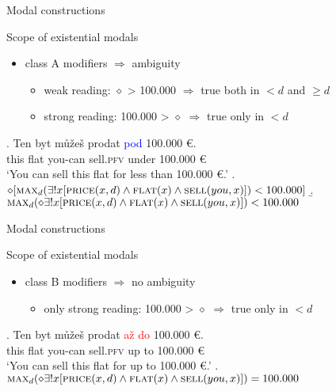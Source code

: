 \documentclass[12pt]{beamer}
\begin{document}
\begin{frame}{Modal constructions}

Scope of existential modals

\begin{itemize}
\item class A modifiers $\Rightarrow$ ambiguity
\begin{itemize}
\item weak reading: $\diamond$ > 100.000 $\Rightarrow$ true both in $< d$ and $\geq d$
\item strong reading: 100.000 > $\diamond$ $\Rightarrow$ true only in $< d$ 
\end{itemize}
\end{itemize}

\exg. Ten byt můžeš prodat \textcolor{blue}{pod} 100.000 {\euro}.\label{ex:classA-ambiguity}\\
this flat you-can sell.\textsc{pfv} under 100.000 {\euro}\\
`You can sell this flat for less than 100.000 {\euro}.'
\a. $\diamond[\textsc{max}_d(\exists !x[\textsc{price}(x,d) \wedge \textsc{flat}(x) \wedge \textsc{sell}(you,x)]) < 100.000]$\label{ex:classA-weak}
\b. $\textsc{max}_d(\diamond \exists ! x[\textsc{price}(x,d) \wedge \textsc{flat}(x) \wedge \textsc{sell}(you,x)]) < 100.000$\label{ex:classA-strong}


\end{frame}

\begin{frame}{Modal constructions}

Scope of existential modals

\begin{itemize}
\item class B modifiers $\Rightarrow$ no ambiguity
\begin{itemize}
\item only strong reading: 100.000 > $\diamond$ $\Rightarrow$ true only in $< d$ 
\end{itemize}
\end{itemize}

\exg. Ten byt můžeš prodat \textcolor{red}{až} \textcolor{red}{do} 100.000 {\euro}.\\
this flat you-can sell.\textsc{pfv} up to 100.000 {\euro}\\
`You can sell this flat for up to 100.000 {\euro}.'
\a. $\textsc{max}_d(\diamond \exists ! x[\textsc{price}(x,d) \wedge \textsc{flat}(x) \wedge \textsc{sell}(you,x)])=100.000$\label{ex:classB-strong}

\end{frame}
\end{document}
